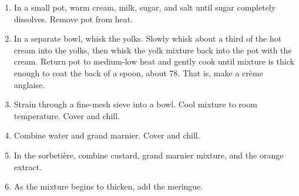 

\begin{ingredients}
\end{ingredients}


\begin{recipe}
  \begin{enumerate}

  \item In a small pot, warm cream, milk, sugar, and salt until sugar
    completely dissolves.  Remove pot from heat.

  \item In a separate bowl, whisk the yolks.  Slowly whisk about a
    third of the hot cream into the yolks, then whisk the yolk mixture
    back into the pot with the cream. Return pot to medium-low heat
    and gently cook until mixture is thick enough to coat the back of
    a spoon, about 78\degreeC.  That is, make a crème anglaise.

  \item Strain through a fine-mesh sieve into a bowl. Cool mixture to
    room temperature. Cover and chill.
    
  \item Combine water and grand marnier.  Cover and chill.

  \item In the sorbetière, combine custard, grand marnier mixture, and
    the orange extract.

  \item As the mixture begins to thicken, add the meringue.

  \end{enumerate}
\end{recipe}

